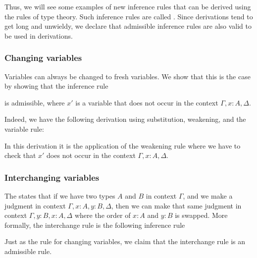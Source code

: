 Thus, we will see some examples of new inference rules that can be derived using the rules of type theory. Such inference rules are called . Since derivations tend to get long and unwieldy, we declare that admissible inference rules are also valid to be used in derivations.

\subsubsection*{Changing variables}

Variables can always be changed to fresh variables. We show that this is the case by showing that the inference rule
\begin{prooftree}
\end{prooftree}
is admissible, where $x'$ is a variable that does not occur in the context $\Gamma,x:A,\Delta$. 

Indeed, we have the following derivation using substitution, weakening, and the variable rule:
\begin{prooftree}
\end{prooftree}
In this derivation it is the application of the weakening rule where we have to check that $x'$ does not occur in the context $\Gamma,x:A,\Delta$.

\subsubsection*{Interchanging variables}

The  states that if we have two types $A$ and $B$ in context $\Gamma$, and we make a judgment in context $\Gamma,x:A,y:B,\Delta$, then we can make that same judgment in context $\Gamma,y:B,x:A,\Delta$ where the order of $x:A$ and $y:B$ is swapped. More formally, the interchange rule is the following inference rule
\begin{prooftree}
\end{prooftree}
Just as the rule for changing variables, we claim that the interchange rule is an admissible rule.

